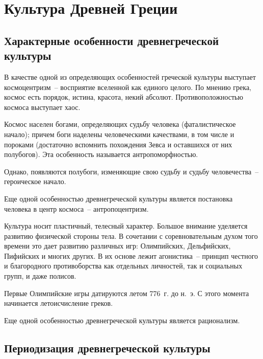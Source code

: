 \chapter{Культура Древней Греции}
\section{Характерные особенности древнегреческой культуры}

  В качестве одной из определяющих особенностей греческой культуры выступает
  космоцентризм~-- восприятие вселенной как единого целого. По мнению грека,
  космос есть порядок, истина, красота, некий абсолют. Противоположностью
  космоса выступает хаос.
  
  Космос населен богами, определяющих судьбу человека (фаталистическое начало);
  причем боги наделены человеческими качествами, в том числе и пороками
  (достаточно вспомнить похождения Зевса и оставшихся от них полубогов). Эта
  особенность называется антропоморфностью.
  
  Однако, появляются полубоги, изменяющие свою судьбу и судьбу человечества~--
  героическое начало.
  
  Еще одной особенностью древнегреческой культуры является постановка человека в
  центр космоса~-- антропоцентризм.
  
  \charskip{*}
  
  Культура носит пластичный, телесный характер. Большое внимание уделяется
  развитию физической стороны тела. В сочетании с соревновательным духом того
  времени это дает развитию различных игр: Олимпийских, Дельфийских, Пифийских и
  многих других. В их основе лежит агонистика~-- принцип честного и благородного
  противоборства как отдельных личностей, так и социальных групп, и даже
  полисов.
  
  Первые Олимпийские игры датируются летом 776~г. до н.~э. С этого момента
  начинается летоисчисление греков.
  
  Еще одной особенностью древнегреческой культуры является рационализм.

\section{Периодизация древнегреческой культуры}


